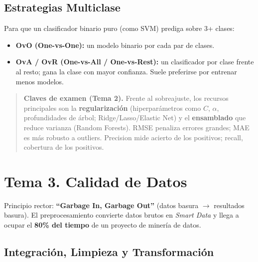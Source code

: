 \documentclass[12pt]{book} %
\providecommand{\tightlist}{%
  \setlength{\itemsep}{0pt}\setlength{\parskip}{0pt}}
\begin{document}
\hypertarget{estrategias-multiclase}{%
\subsection{Estrategias Multiclase}\label{estrategias-multiclase}}

Para que un clasificador binario puro (como SVM) prediga sobre 3+
clases:

\begin{itemize}
\tightlist
\item
  \textbf{OvO (One-vs-One):} un modelo binario por cada par de clases.
\item
  \textbf{OvA / OvR (One-vs-All / One-vs-Rest):} un clasificador por
  clase frente al resto; gana la clase con mayor confianza. Suele
  preferirse por entrenar menos modelos.
\end{itemize}

\begin{quote}
\textbf{Claves de examen (Tema 2).} Frente al sobreajuste, los recursos
principales son la \textbf{regularización} (hiperparámetros como \(C\),
\(\alpha\), profundidades de árbol; Ridge/Lasso/Elastic Net) y el
\textbf{ensamblado} que reduce varianza (Random Forests). RMSE penaliza
errores grandes; MAE es más robusto a outliers. Precision mide acierto
de los positivos; recall, cobertura de los positivos.
\end{quote}

\hypertarget{tema-3.-calidad-de-datos}{%
\section{Tema 3. Calidad de Datos}\label{tema-3.-calidad-de-datos}}

Principio rector: \textbf{``Garbage In, Garbage Out''} (datos basura
\(\to\) resultados basura). El preprocesamiento convierte datos brutos
en \emph{Smart Data} y llega a ocupar el \textbf{80\% del tiempo} de un
proyecto de minería de datos.

\hypertarget{integraciuxf3n-limpieza-y-transformaciuxf3n}{%
\subsection{Integración, Limpieza y
Transformación}\label{integraciuxf3n-limpieza-y-transformaciuxf3n}}
\end{document}
